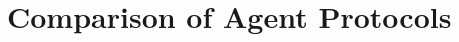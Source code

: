 \documentclass{article}
\begin{document}




\section{Comparison of Agent Protocols}
\end{document}
